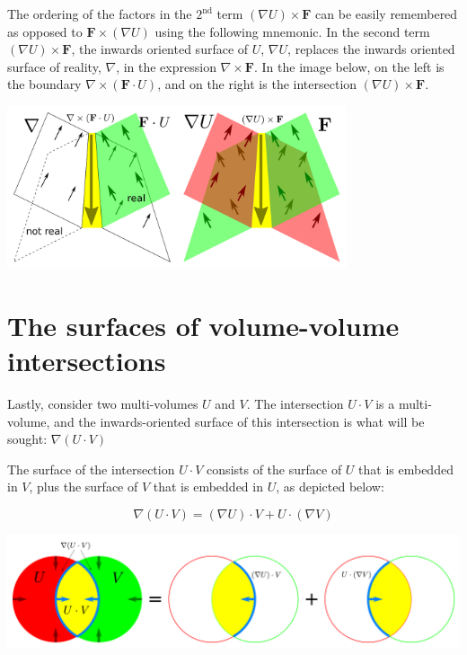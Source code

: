 The ordering of the factors in the \(2^\text{nd}\) term \((\nabla U) \times \mathbf{F}\) can be easily remembered as opposed to \(\mathbf{F} \times (\nabla U)\) using the following mnemonic. In the second term \((\nabla U) \times \mathbf{F}\), the inwards oriented surface of \(U\), \(\nabla U\), replaces the inwards oriented surface of reality, \(\nabla\), in the expression \(\nabla \times \mathbf{F}\). In the image below, on the left is the boundary \(\nabla \times (\mathbf{F} \cdot U)\), and on the right is the intersection \((\nabla U) \times \mathbf{F}\).

\begin{center}
\includegraphics[width = 0.75\textwidth]{Boundaries/Surface_boundaries/surface_volume_intersection_mnemonic}
\end{center}




\section{The surfaces of volume-volume intersections}

Lastly, consider two multi-volumes \(U\) and \(V\). The intersection \(U \cdot V\) is a multi-volume, and the inwards-oriented surface of this intersection is what will be sought: \(\nabla(U \cdot V)\)

The surface of the intersection \(U \cdot V\) consists of the surface of \(U\) that is embedded in \(V\), plus the surface of \(V\) that is embedded in \(U\), as depicted below: 

\begin{thm}
\[\nabla(U \cdot V) = (\nabla U) \cdot V + U \cdot (\nabla V)\]
\end{thm}

\begin{center}
\includegraphics[width = \textwidth]{Boundaries/Volume_inwards_oriented_surfaces/volume_volume_intersection_surface}
\end{center}



